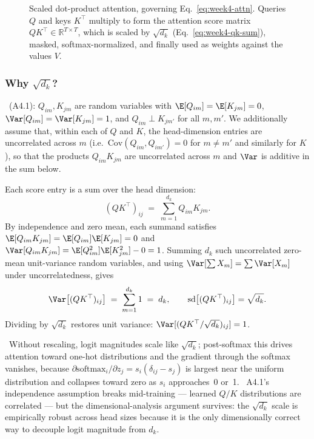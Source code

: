 \begin{figure}[h]
\centering

\caption{Scaled dot-product attention, governing
  Eq.~\eqref{eq:week4-attn}. Queries $Q$ and keys $K^{\top}$ multiply
  to form the attention score matrix $Q K^{\top} \in \mathbb{R}^{T
  \times T}$, which is scaled by $\sqrt{d_k}$
  (Eq.~\eqref{eq:week4-qk-sum}), masked, softmax-normalized, and
  finally used as weights against the values $V$.}
\label{fig:week4-attn-scores}
\end{figure}

\subsubsection{\texorpdfstring{Why $\sqrt{d_k}$?}{Why sqrt(d\_k)?}}

\begin{derivation}
\Assum\ (A4.1): $Q_{im}, K_{jm}$ are random variables with
$\E[Q_{im}] = \E[K_{jm}] = 0$, $\Var[Q_{im}] = \Var[K_{jm}] = 1$,
and $Q_{im} \perp K_{jm'}$ for all $m,m'$. We additionally assume
that, within each of $Q$ and $K$, the head-dimension entries are
uncorrelated across $m$ (i.e.\ $\mathrm{Cov}(Q_{im},Q_{im'}) = 0$ for
$m\neq m'$ and similarly for $K$), so that the products
$Q_{im}K_{jm}$ are uncorrelated across $m$ and $\Var$ is additive
in the sum below.
\label{eq:week4-qk-var-assumption}

Each score entry is a sum over the head dimension:
\begin{equation}
(QK^{\top})_{ij} \;=\; \sum_{m=1}^{d_k} Q_{im} K_{jm}.
\label{eq:week4-qk-sum}
\end{equation}
By independence and zero mean, each summand satisfies
$\E[Q_{im}K_{jm}] = \E[Q_{im}]\E[K_{jm}] = 0$ and
$\Var[Q_{im}K_{jm}] = \E[Q_{im}^2]\E[K_{jm}^2] - 0 = 1$. Summing $d_k$
such uncorrelated zero-mean unit-variance random variables, and
using $\Var[\sum X_m] = \sum \Var[X_m]$ under uncorrelatedness, gives
\begin{equation}
\Var\!\left[(QK^{\top})_{ij}\right] \;=\; \sum_{m=1}^{d_k} 1 \;=\; d_k,
\qquad
\mathrm{sd}\!\left[(QK^{\top})_{ij}\right] = \sqrt{d_k}.
\end{equation}
Dividing by $\sqrt{d_k}$ restores unit variance:
$\Var[(QK^{\top}/\sqrt{d_k})_{ij}] = 1$.
\end{derivation}

\Cons\ Without rescaling, logit magnitudes scale like $\sqrt{d_k}$;
post-softmax this drives attention toward one-hot distributions
and the gradient through the softmax vanishes, because
$\partial \mathrm{softmax}_i / \partial z_j = s_i(\delta_{ij} - s_j)$
is largest near the uniform distribution and collapses toward zero
as $s_i$ approaches~0 or~1. \Heur\ A4.1's independence assumption
breaks mid-training --- learned $Q/K$ distributions are correlated ---
but the dimensional-analysis argument survives: the $\sqrt{d_k}$ scale
is empirically robust across head sizes because it is the only
dimensionally correct way to decouple logit magnitude from $d_k$.

